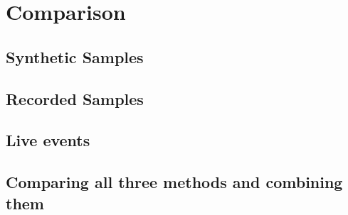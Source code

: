 \chapter{Comparison}\label{Comparison}
\section{Synthetic Samples}
\section{Recorded Samples}
\section{Live events}
\section{Comparing all three methods and combining them}


